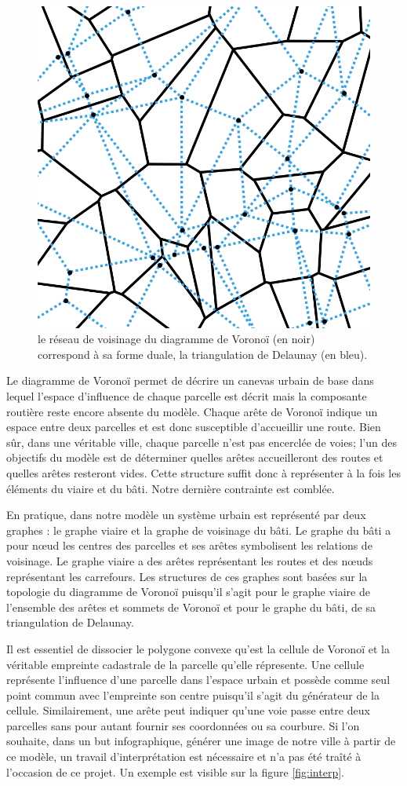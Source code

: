 \documentclass[12pt]{article}
\begin{document}
\begin{figure}[H]
  \centering
  \includegraphics[width=.7\linewidth]{images/delaunay.png}
  \caption{le réseau de voisinage du diagramme de Voronoï (en noir)
    correspond à sa forme duale, la triangulation de Delaunay (en
    bleu).}
  \label{fig:delaunay}
\end{figure}

Le diagramme de Voronoï permet de décrire un canevas urbain de base
dans lequel l'espace d'influence de chaque parcelle est décrit mais la
composante routière reste encore absente du modèle. Chaque arête de
Voronoï indique un espace entre deux parcelles et est donc susceptible
d'accueillir une route. Bien sûr, dans une véritable ville, chaque
parcelle n'est pas encerclée de voies; l'un des objectifs du modèle
est de déterminer quelles arêtes accueilleront des routes et quelles
arêtes resteront vides. Cette structure suffit donc à représenter à la
fois les éléments du viaire et du bâti. Notre dernière contrainte est
comblée.

En pratique, dans notre modèle un système urbain est représenté par
deux graphes : le graphe viaire et la graphe de voisinage du bâti. Le
graphe du bâti a pour n\oe ud les centres des parcelles et ses arêtes
symbolisent les relations de voisinage. Le graphe viaire a des arêtes
représentant les routes et des n\oe uds représentant les
carrefours. Les structures de ces graphes sont basées sur la topologie
du diagramme de Voronoï puisqu'il s'agit pour le graphe viaire de
l'ensemble des arêtes et sommets de Voronoï et pour le graphe du bâti,
de sa triangulation de Delaunay.

Il est essentiel de dissocier le polygone convexe qu'est la cellule de
Voronoï et la véritable empreinte cadastrale de la parcelle qu'elle
répresente. Une cellule représente l'influence d'une parcelle dans
l'espace urbain et possède comme seul point commun avec l'empreinte
son centre puisqu'il s'agit du générateur de la
cellule. Similairement, une arête peut indiquer qu'une voie passe
entre deux parcelles sans pour autant fournir ses coordonnées ou sa
courbure. Si l'on souhaite, dans un but infographique, générer une
image de notre ville à partir de ce modèle, un travail
d'interprétation est nécessaire et n'a pas été traîté à l'occasion de
ce projet. Un exemple est visible sur la figure \ref{fig:interp}.
\end{document}
